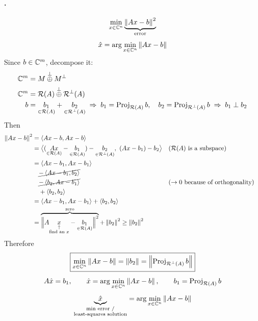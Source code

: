 \paragraph{.}
\[
\min_{x\in\mathbb{C}^n} \underbrace{\left\lVert Ax-b \right\rVert^{2}}_{\text{error}}
\]
\[
\hat x = \arg\min_{x\in\mathbb{C}^n}\left\lVert Ax-b \right\rVert
\]
Since $b\in\mathbb{C}^m$, decompose it:
\begin{align*}
\mathbb{C}^m &= M\overset{\perp}{\oplus}M^\perp\\
\mathbb{C}^m &= \mathcal{R}(A)\overset{\perp}{\oplus}\mathcal{R}^\perp(A)\\
b &= \underset{\in\mathcal{R}(A)}{b_1} + \underset{\in\mathcal{R}^\perp(A)}{b_2}
\;\Rightarrow\; b_1 = \operatorname{Proj}_{\mathcal{R}(A)} b, \quad b_2 = \operatorname{Proj}_{\mathcal{R}^\perp(A)} b
\;\Rightarrow\; b_1\perp b_2
\end{align*}
Then
\begin{align*}
\left\lVert Ax-b \right\rVert^2 &= \left\langle Ax-b, Ax-b \right\rangle\\
&= \big\langle (\underset{\in\mathcal{R}(A)}{Ax}-\underset{\in\mathcal{R}(A)}{b_1}) - \underset{\in\mathcal{R}^\perp(A)}{b_2},\ (Ax-b_1)-b_2\big\rangle
&& (\mathcal{R}(A) \text{ is a subspace})\\
&= \left\langle Ax-b_1, Ax-b_1 \right\rangle\\
&\quad \cancel{-\left\langle Ax-b_1, b_2 \right\rangle}\\
&\quad \cancel{-\left\langle b_2, Ax-b_1 \right\rangle} && (\to 0 \text{ because of orthogonality})\\
&\quad +\left\langle b_2, b_2 \right\rangle\\
&= \left\langle Ax-b_1, Ax-b_1 \right\rangle + \left\langle b_2, b_2 \right\rangle\\
&= \overbrace{\Big\lVert A\underset{\substack{\uparrow\\ \text{find an } x}}{x}-\underset{\in\mathcal{R}(A)}{b_1}\Big\rVert^2}^{\text{zero}} + \left\lVert b_2 \right\rVert^2 \geq \left\lVert b_2 \right\rVert^2
\end{align*}
Therefore
\begin{gather*}
\boxed{\min_{x\in\mathbb{C}^n}\left\lVert Ax-b \right\rVert = \left\lVert b_2 \right\rVert = \left\lVert \operatorname{Proj}_{\mathcal{R}^\perp(A)} b \right\rVert}\\*[4pt]
A\hat x = b_1, \qquad \hat x = \arg\min_{x\in\mathbb{C}^n}\left\lVert Ax-b \right\rVert, \qquad
b_1 = \operatorname{Proj}_{\mathcal{R}(A)} b\\*[4pt]
\underbrace{\hat x}_{\substack{\text{min error /}\\ \text{least-squares solution}}} = \arg\min_{x\in\mathbb{C}^n}\left\lVert Ax-b \right\rVert
\end{gather*}
